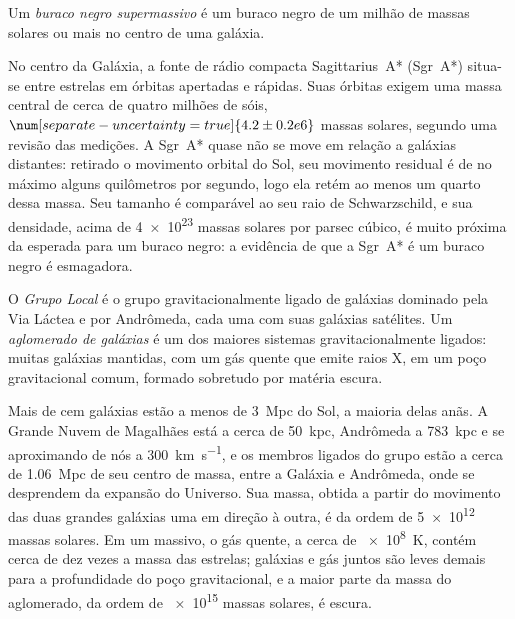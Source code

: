 \begin{definition}\label{def:b3:milky-way-galaxies:smbh}
Um \emph{buraco negro supermassivo} é um buraco
negro de um milhão de massas solares ou mais no centro de uma galáxia.
\end{definition}

No centro da Galáxia, a fonte de rádio compacta Sagittarius~A*
(Sgr~A*) situa-se entre estrelas em órbitas apertadas e rápidas. Suas órbitas exigem uma
massa central de cerca de quatro milhões de sóis, $\num[separate-uncertainty=true]{4.2 \pm 0.2 e6}$
massas solares, segundo uma revisão das medições. A Sgr~A* quase não se move
em relação a galáxias distantes: retirado o movimento orbital do Sol, seu
movimento residual é de no máximo alguns quilômetros por segundo, logo ela retém ao
menos um quarto dessa massa. Seu tamanho é comparável ao seu raio de Schwarzschild,
e sua densidade, acima de \num{4e23} massas solares por parsec cúbico,
é muito próxima da esperada para um buraco negro: a evidência de
que a Sgr~A* é um buraco negro é esmagadora.

\begin{definition}\label{def:b3:milky-way-galaxies:groups}
O \emph{Grupo Local} é o grupo gravitacionalmente ligado
de galáxias dominado pela Via Láctea e por Andrômeda, cada uma com
suas galáxias satélites. Um \emph{aglomerado de galáxias} é
um dos maiores sistemas gravitacionalmente ligados: muitas galáxias mantidas,
com um gás quente que emite raios X, em um poço gravitacional comum,
formado sobretudo por matéria escura.
\end{definition}

Mais de cem galáxias estão a menos de \qty{3}{Mpc} do Sol, a maioria
delas anãs. A Grande Nuvem de Magalhães está a cerca de \qty{50}{kpc}, Andrômeda a
\qty{783}{kpc} e se aproximando de nós a \qty{300}{km.s^{-1}}, e os membros ligados
do grupo estão a cerca de \qty{1.06}{Mpc} de seu centro de
massa, entre a Galáxia e Andrômeda, onde se desprendem da
expansão do Universo. Sua massa, obtida a partir do movimento das duas grandes
galáxias uma em direção à outra, é da ordem de \num{5e12} massas solares. Em um
 massivo, o gás quente, a cerca de \qty{e8}{K}, contém cerca de dez
vezes a massa das estrelas; galáxias e gás juntos são leves demais para
a profundidade do poço gravitacional, e a maior parte da massa do aglomerado,
da ordem de \num{e15} massas solares, é escura.

